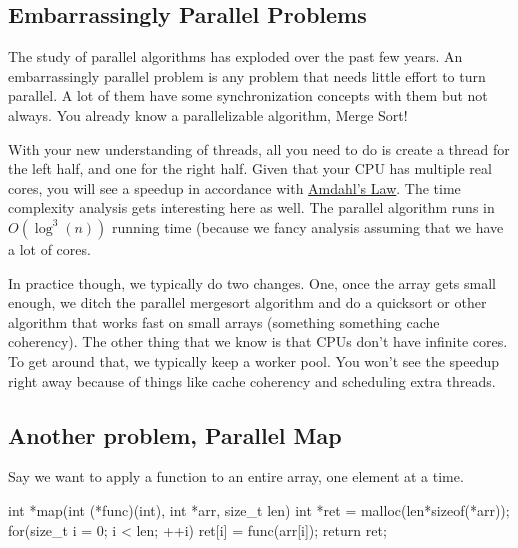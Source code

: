 \begin{aside}

\subsection{Embarrassingly Parallel Problems}\label{embarrassingly-parallel-problems}

The study of parallel algorithms has exploded over the past few years. An embarrassingly parallel problem is any problem that needs little effort to turn parallel. A lot of them have some synchronization concepts with them but not always. You already know a parallelizable algorithm, Merge Sort!

\begin{code}[language=C]
void merge_sort(int *arr, size_t len){
   if(len > 1){
   //Mergesort the left half
   //Mergesort the right half
   //Merge the two halves
   }
\end{code}

With your new understanding of threads, all you need to do is create a thread for the left half, and one for the right half. Given that your CPU has multiple real cores, you will see a speedup in accordance with \href{https://en.wikipedia.org/wiki/Amdahl's_law}{Amdahl's Law}. The time complexity analysis gets interesting here as well. The parallel algorithm runs in $O(\log^3(n))$ running time (because we fancy analysis assuming that we have a lot of cores.

In practice though, we typically do two changes. One, once the array gets small enough, we ditch the parallel mergesort algorithm and do a quicksort or other algorithm that works fast on small arrays (something something cache coherency). The other thing that we know is that CPUs don't have infinite cores. To get around that, we typically keep a worker pool. You won't see the speedup right away because of things like cache coherency and scheduling extra threads.

\subsection{Another problem, Parallel Map}\label{another-problem-parallel-map}

Say we want to apply a function to an entire array, one element at a time.

\begin{code}[language=C]

int *map(int (*func)(int), int *arr, size_t len){
  int *ret = malloc(len*sizeof(*arr));
  for(size_t i = 0; i < len; ++i) 
      ret[i] = func(arr[i]);
  return ret;
}
\end{code}


\end{aside}

